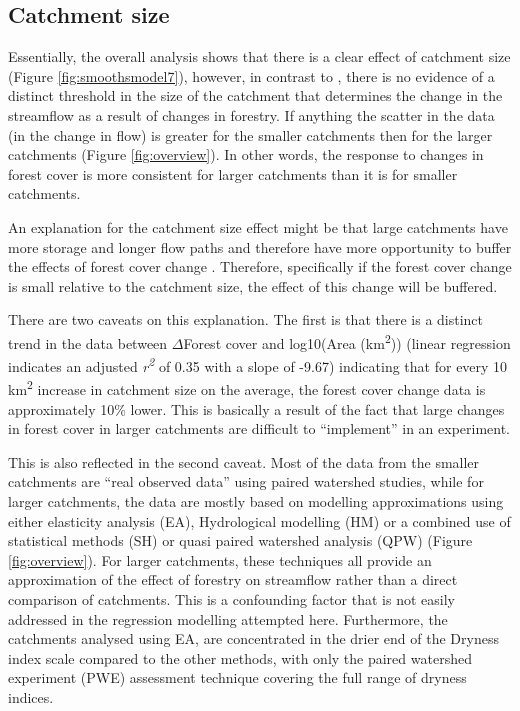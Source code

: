 \documentclass[]{elsarticle} %
\begin{document}
\hypertarget{catchment-size}{%
\subsection{Catchment size}\label{catchment-size}}

Essentially, the overall analysis shows that there is a clear effect of catchment size (Figure \ref{fig:smoothsmodel7}), however, in contrast to \citet{zhang2017}, there is no evidence of a distinct threshold in the size of the catchment that determines the change in the streamflow as a result of changes in forestry. If anything the scatter in the data (in the change in flow) is greater for the smaller catchments then for the larger catchments (Figure \ref{fig:overview}). In other words, the response to changes in forest cover is more consistent for larger catchments than it is for smaller catchments.

An explanation for the catchment size effect might be that large catchments have more storage and longer flow paths and therefore have more opportunity to buffer the effects of forest cover change \citep{navas2019}. Therefore, specifically if the forest cover change is small relative to the catchment size, the effect of this change will be buffered.

There are two caveats on this explanation. The first is that there is a distinct trend in the data between \(\Delta\)Forest cover and log10(Area (km\textsuperscript{2})) (linear regression indicates an adjusted \emph{r\textsuperscript{2}} of 0.35 with a slope of -9.67) indicating that for every 10 km\textsuperscript{2} increase in catchment size on the average, the forest cover change data is approximately 10\% lower. This is basically a result of the fact that large changes in forest cover in larger catchments are difficult to ``implement'' in an experiment.

This is also reflected in the second caveat. Most of the data from the smaller catchments are ``real observed data'' using paired watershed studies, while for larger catchments, the data are mostly based on modelling approximations using either elasticity analysis (EA), Hydrological modelling (HM) or a combined use of statistical methods (SH) or quasi paired watershed analysis (QPW) (Figure \ref{fig:overview}). For larger catchments, these techniques all provide an approximation of the effect of forestry on streamflow rather than a direct comparison of catchments. This is a confounding factor that is not easily addressed in the regression modelling attempted here. Furthermore, the catchments analysed using EA, are concentrated in the drier end of the Dryness index scale compared to the other methods, with only the paired watershed experiment (PWE) assessment technique covering the full range of dryness indices.
\end{document}
